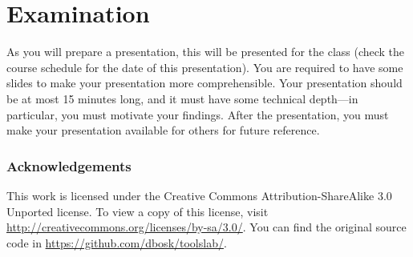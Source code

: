 \section{Examination}
\label{sec:exam}
As you will prepare a presentation, this will be presented for the class (check 
the course schedule for the date of this presentation).
You are required to have some slides to make your presentation more 
comprehensible.
Your presentation should be at most 15 minutes long, and it must have some 
technical depth---in particular, you must motivate your findings.
After the presentation, you must make your presentation available for others 
for future reference.


\subsubsection*{Acknowledgements}

This work is licensed under the Creative Commons Attribution-ShareAlike 3.0 
Unported license.
To view a copy of this license, visit 
\url{http://creativecommons.org/licenses/by-sa/3.0/}.
You can find the original source code in 
\url{https://github.com/dbosk/toolslab/}.


\printbibliography{}
